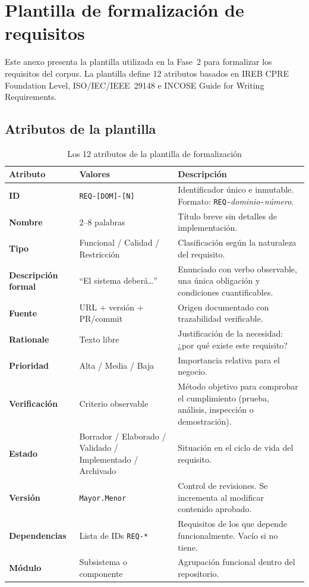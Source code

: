 \chapter{Plantilla de formalizaci\'on de requisitos}
\label{anexo:plantilla}

Este anexo presenta la plantilla utilizada en la Fase~2 para formalizar los requisitos del corpus. La plantilla define 12 atributos basados en IREB CPRE Foundation Level, ISO/IEC/IEEE~29148 e INCOSE Guide for Writing Requirements.

\section{Atributos de la plantilla}

\begin{table}[h]
\centering
\caption{Los 12 atributos de la plantilla de formalizaci\'on}
\label{tab:plantilla-anexo}
\begin{tabular}{lp{3cm}p{7cm}}
\toprule
\textbf{Atributo} & \textbf{Valores} & \textbf{Descripci\'on} \\
\midrule
\textbf{ID} & \texttt{REQ-[DOM]-[N]} & Identificador \'unico e inmutable. Formato: \texttt{REQ-}\emph{dominio}\texttt{-}\emph{n\'umero}. \\
\textbf{Nombre} & 2--8 palabras & T\'itulo breve sin detalles de implementaci\'on. \\
\textbf{Tipo} & Funcional / Calidad / Restricci\'on & Clasificaci\'on seg\'un la naturaleza del requisito. \\
\textbf{Descripci\'on formal} & ``El sistema deber\'a\dots'' & Enunciado con verbo observable, una \'unica obligaci\'on y condiciones cuantificables. \\
\textbf{Fuente} & URL + versi\'on + PR/commit & Origen documentado con trazabilidad verificable. \\
\textbf{Rationale} & Texto libre & Justificaci\'on de la necesidad: ¿por qu\'e existe este requisito? \\
\textbf{Prioridad} & Alta / Media / Baja & Importancia relativa para el negocio. \\
\textbf{Verificaci\'on} & Criterio observable & M\'etodo objetivo para comprobar el cumplimiento (prueba, an\'alisis, inspecci\'on o demostraci\'on). \\
\textbf{Estado} & Borrador / Elaborado / Validado / Implementado / Archivado & Situaci\'on en el ciclo de vida del requisito. \\
\textbf{Versi\'on} & \texttt{Mayor.Menor} & Control de revisiones. Se incrementa al modificar contenido aprobado. \\
\textbf{Dependencias} & Lista de IDs \texttt{REQ-*} & Requisitos de los que depende funcionalmente. Vac\'io si no tiene. \\
\textbf{M\'odulo} & Subsistema o componente & Agrupaci\'on funcional dentro del repositorio. \\
\bottomrule
\end{tabular}
\end{table}

